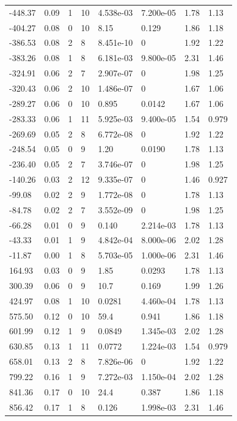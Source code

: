 \documentclass[preview]{standalone}
\begin{document}
{{\begin{tabular}{L{1.2cm}C{1.2cm} C{0.3cm}C{0.5cm} C{1.4cm}C{1.4cm} C{1.4cm}C{1.4cm}}
  -448.37  &  0.09  & 1     & 10 &  4.538e-03  & 7.200e-05  & 1.78 &  1.13   \\ 
  -404.27  &  0.08  & 0     & 10 &  8.15  & 0.129  & 1.86 &  1.18   \\ 
  -386.53  &  0.08  & 2     &  8 &  8.451e-10  & 0  & 1.92 &  1.22   \\ 
  -383.26  &  0.08  & 1     &  8 &  6.181e-03  & 9.800e-05  & 2.31 &  1.46   \\ 
  -324.91  &  0.06  & 2     &  7 &  2.907e-07  & 0  & 1.98 &  1.25   \\ 
  -320.43  &  0.06  & 2     & 10 &  1.486e-07  & 0  & 1.67 &  1.06   \\ 
  -289.27  &  0.06  & 0     & 10 &  0.895  & 0.0142  & 1.67 &  1.06   \\ 
  -283.33  &  0.06  & 1     & 11 &  5.925e-03  & 9.400e-05  & 1.54 &  0.979   \\ 
  -269.69  &  0.05  & 2     &  8 &  6.772e-08  & 0  & 1.92 &  1.22   \\ 
  -248.54  &  0.05  & 0     &  9 &  1.20  & 0.0190  & 1.78 &  1.13   \\ 
  -236.40  &  0.05  & 2     &  7 &  3.746e-07  & 0  & 1.98 &  1.25   \\ 
  -140.26  &  0.03  & 2     & 12 &  9.335e-07  & 0  & 1.46 &  0.927   \\ 
  -99.08  &  0.02  & 2     &  9 &  1.772e-08  & 0  & 1.78 &  1.13   \\ 
  -84.78  &  0.02  & 2     &  7 &  3.552e-09  & 0  & 1.98 &  1.25   \\ 
  -66.28  &  0.01  & 0     &  9 &  0.140  & 2.214e-03  & 1.78 &  1.13   \\ 
  -43.33  &  0.01  & 1     &  9 &  4.842e-04  & 8.000e-06  & 2.02 &  1.28   \\ 
  -11.87  &  0.00  & 1     &  8 &  5.703e-05  & 1.000e-06  & 2.31 &  1.46   \\ 
  164.93  &  0.03  & 0     &  9 &  1.85  & 0.0293  & 1.78 &  1.13   \\ 
  300.39  &  0.06  & 0     &  9 &  10.7  & 0.169  & 1.99 &  1.26   \\ 
  424.97  &  0.08  & 1     & 10 &  0.0281  & 4.460e-04  & 1.78 &  1.13   \\ 
  575.50  &  0.12  & 0     & 10 &  59.4  & 0.941  & 1.86 &  1.18   \\ 
  601.99  &  0.12  & 1     &  9 &  0.0849  & 1.345e-03  & 2.02 &  1.28   \\ 
  630.85  &  0.13  & 1     & 11 &  0.0772  & 1.224e-03  & 1.54 &  0.979   \\ 
  658.01  &  0.13  & 2     &  8 &  7.826e-06  & 0  & 1.92 &  1.22   \\ 
  799.22  &  0.16  & 1     &  9 &  7.272e-03  & 1.150e-04  & 2.02 &  1.28   \\ 
  841.36  &  0.17  & 0     & 10 &  24.4  & 0.387  & 1.86 &  1.18   \\ 
  856.42  &  0.17  & 1     &  8 &  0.126  & 1.998e-03  & 2.31 &  1.46   \\ 
\hline 
\end{tabular} 

}}
\end{document}
